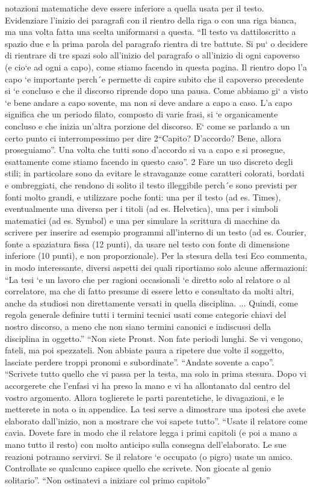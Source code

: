 notazioni matematiche deve essere inferiore a quella usata per il testo.
Evidenziare l’inizio dei paragrafi con il rientro della riga o con una riga
bianca, ma una volta fatta una scelta uniformarsi a questa.
“Il testo va dattiloscritto a spazio due e la prima parola del paragrafo
rientra di tre battute. Si pu` o decidere di rientrare di tre spazi solo all’inizio
del paragrafo o all’inizio di ogni capoverso (e cio`e ad ogni a capo), come
stiamo facendo in questa pagina.
Il rientro dopo l’a capo `e importante perch´e permette di capire subito
che il capoverso precedente si `e concluso e che il discorso riprende dopo una
pausa. Come abbiamo gi` a visto `e bene andare a capo sovente, ma non si
deve andare a capo a caso. L’a capo significa che un periodo filato, composto
di varie frasi, si `e organicamente concluso e che inizia un’altra porzione del
discorso. E` come se parlando a un certo punto ci interrompessimo per dire
2“Capito? D’accordo? Bene, allora proseguiamo”. Una volta che tutti sono
d’accordo si va a capo e si prosegue, esattamente come stiamo facendo in
questo caso”. 2
Fare un uso discreto degli stili; in particolare sono da evitare le stravaganze come caratteri colorati, bordati e ombreggiati, che rendono di solito
il testo illeggibile perch´e sono previsti per fonti molto grandi, e utilizzare
poche fonti: una per il testo (ad es. Times), eventualmente una diversa per
i titoli (ad es. Helvetica), una per i simboli matematici (ad es. Symbol) e una
per simulare la scrittura di macchine da scrivere per inserire ad esempio programmi all’interno di un testo (ad es. Courier, fonte a spaziatura fissa
(12 punti), da usare nel testo con fonte di dimensione inferiore (10
punti), e non proporzionale).
Per la stesura della tesi Eco commenta, in modo interessante, diversi
aspetti dei quali riportiamo solo alcune affermazioni:
“La tesi `e un lavoro che per ragioni occasionali `e diretto solo al relatore o
al correlatore, ma che di fatto presume di essere letto e consultato da molti
altri, anche da studiosi non direttamente versati in quella disciplina.
... Quindi, come regola generale definire tutti i termini tecnici usati come
categorie chiavi del nostro discorso, a meno che non siano termini canonici
e indiscussi della disciplina in oggetto.”
“Non siete Proust. Non fate periodi lunghi. Se vi vengono, fateli, ma
poi spezzateli. Non abbiate paura a ripetere due volte il soggetto, lasciate
perdere troppi pronomi e subordinate”.
“Andate sovente a capo”.
“Scrivete tutto quello che vi passa per la testa, ma solo in prima stesura.
Dopo vi accorgerete che l’enfasi vi ha preso la mano e vi ha allontanato
dal centro del vostro argomento. Allora toglierete le parti parentetiche, le
divagazioni, e le metterete in nota o in appendice. La tesi serve a dimostrare
una ipotesi che avete elaborato dall’inizio, non a mostrare che voi sapete
tutto”.
“Usate il relatore come cavia. Dovete fare in modo che il relatore legga i
primi capitoli (e poi a mano a mano tutto il resto) con molto anticipo sulla
consegna dell’elaborato. Le sue reazioni potranno servirvi. Se il relatore `e
occupato (o pigro) usate un amico. Controllate se qualcuno capisce quello
che scrivete. Non giocate al genio solitario”.
“Non ostinatevi a iniziare col primo capitolo”